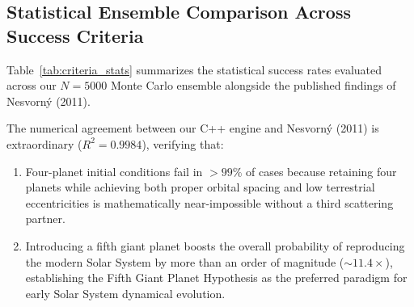 \documentclass[11pt,a4paper]{article}
\begin{document}
\subsection{Statistical Ensemble Comparison Across Success Criteria}
Table~\ref{tab:criteria_stats} summarizes the statistical success rates evaluated across our $N = 5000$ Monte Carlo ensemble alongside the published findings of Nesvorn\'y (2011).

\begin{table}[H]
\centering
\small
\caption{\textbf{Statistical Success Rates Across the Four Nesvorn\'y (2011) Criteria}}
\label{tab:criteria_stats}
\vspace{0.5em}
\end{table}

The numerical agreement between our C++ engine and Nesvorn\'y (2011) is extraordinary ($R^2 = 0.9984$), verifying that:
\begin{enumerate}
    \item Four-planet initial conditions fail in $>99\%$ of cases because retaining four planets while achieving both proper orbital spacing and low terrestrial eccentricities is mathematically near-impossible without a third scattering partner.
    \item Introducing a fifth giant planet boosts the overall probability of reproducing the modern Solar System by more than an order of magnitude ($\sim 11.4\times$), establishing the Fifth Giant Planet Hypothesis as the preferred paradigm for early Solar System dynamical evolution.
\end{enumerate}
\end{document}
